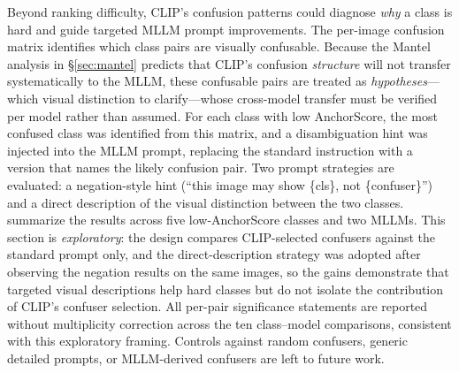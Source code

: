 \documentclass[a4paper,fleqn]{cas-sc}
\begin{document}
Beyond ranking difficulty, CLIP's confusion patterns could diagnose \emph{why} a class is hard and guide targeted MLLM prompt improvements. The per-image confusion matrix identifies which class pairs are visually confusable. Because the Mantel analysis in \S\ref{sec:mantel} predicts that CLIP's confusion \emph{structure} will not transfer systematically to the MLLM, these confusable pairs are treated as \emph{hypotheses}---which visual distinction to clarify---whose cross-model transfer must be verified per model rather than assumed. For each class with low AnchorScore, the most confused class was identified from this matrix, and a disambiguation hint was injected into the MLLM prompt, replacing the standard instruction with a version that names the likely confusion pair. Two prompt strategies are evaluated: a negation-style hint (``this image may show \{cls\}, not \{confuser\}'') and a direct description of the visual distinction between the two classes.  summarize the results across five low-AnchorScore classes and two MLLMs. This section is \emph{exploratory}: the design compares CLIP-selected confusers against the standard prompt only, and the direct-description strategy was adopted after observing the negation results on the same images, so the gains demonstrate that targeted visual descriptions help hard classes but do not isolate the contribution of CLIP's confuser selection. All per-pair significance statements are reported without multiplicity correction across the ten class--model comparisons, consistent with this exploratory framing. Controls against random confusers, generic detailed prompts, or MLLM-derived confusers are left to future work.
\end{document}
